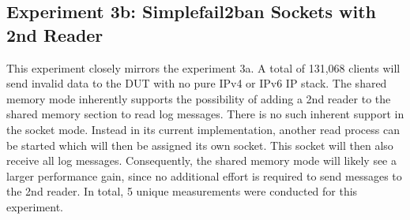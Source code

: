 \subsection{Experiment 3b: Simplefail2ban Sockets with 2nd Reader}
This experiment closely mirrors the experiment 3a.
A total of 131,068 clients will send invalid data to the DUT with no pure IPv4 or IPv6 IP stack.
The shared memory mode inherently supports the possibility of adding a 2nd reader to the shared memory section to read log messages.
There is no such inherent support in the socket mode.
Instead in its current implementation, another read process can be started which will then be assigned its own socket.
This socket will then also receive all log messages.
Consequently, the shared memory mode will likely see a larger performance gain, since no additional effort is required to send messages to the 2nd reader. 
In total, 5 unique measurements were conducted for this experiment.
